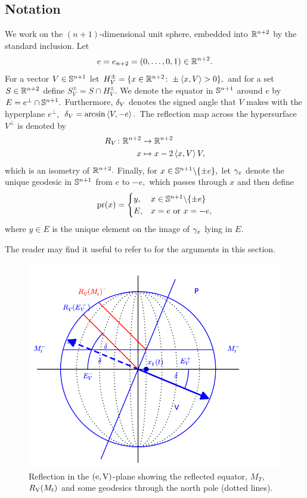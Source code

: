 \documentclass{amsart}
\begin{document}
\subsection{Notation}
We work on the $(n+1)$-dimensional unit sphere, embedded into $\R^{n+2}$ by the standard inclusion.
Let
$$e=e_{n+2}=\br{0,\dots,0,1}\in \R^{n+2}.$$
For a vector $V\in \S^{n+1}$ let
$H_{V}^{\pm}=\{x\in\R^{n+2}\cn \pm\inpr{x}{V}>0\},$ and
for a set $S\in \R^{n+2}$ define
$S^{\pm}_{V}=S\cap H^{\pm}_{V}.$ We denote the equator in $\S^{n+1}$ around $e$ by
$E=e^{\perp}\cap \S^{n+1}.$
Furthermore, $\d_{V}$ denotes the signed angle that $V$ makes with the hyperplane $e^{\perp},$
$\d_{V}=\arcsin\inpr{V}{-e}.$
The reflection map across the hypersurface $V^{\perp}$ is denoted by
\begin{align*}
R_{V}\cn\R^{n+2}&\ra \R^{n+2}\\
            x&\mt x-2\inpr{x}{V}V,
            \end{align*}
which is an isometry of $\R^{n+2}.$
Finally, for $x\in \S^{n+1}\bs\{\pm e\},$
let $\g_{x}$ denote the unique geodesic in $\S^{n+1}$ from $e$ to $-e,$ which passes through $x$ and then define
\begin{align*}
\pr(x)=\begin{cases} y, & x\in \S^{n+1}\bs\{\pm e\}\\
                E, & x=e~\text{or}~x=-e,\end{cases}
                \end{align*}
where $y\in E$ is the unique element on the image of $\g_{x}$ lying in $E.$

The reader may find it useful to refer to  for the arguments in this section.
\begin{figure}[htb]
\centering
\includegraphics[width=.9\linewidth]{./reflection.pdf}
\caption{Reflection in the $(\vertvec, \reflectionvector)$-plane showing the reflected equator, \(M_T\), \(\reflectionmap(M_t)\) and some geodesics through the north pole (dotted lines).}
\label{fig:reflection}
\end{figure}
\end{document}
